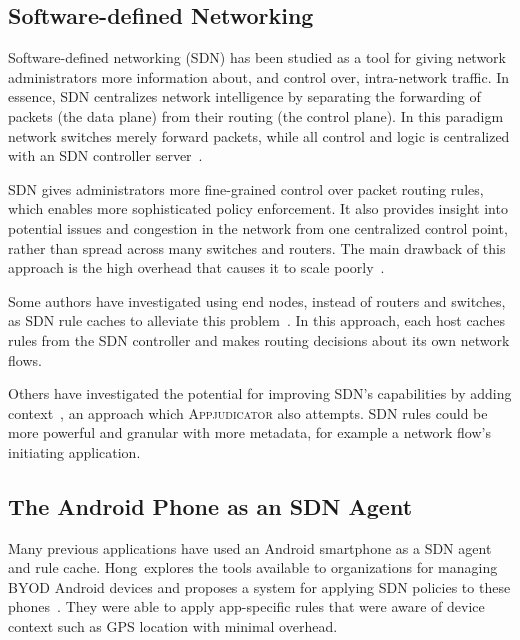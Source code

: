 \subsection{Software-defined Networking}
\label{sec:software-defined-networking}

Software-defined networking (SDN) has been studied as a tool for giving network administrators more information about, and control over, intra-network traffic. In essence, SDN centralizes network intelligence by separating the forwarding of packets (the data plane) from their routing (the control plane). In this paradigm network switches merely forward packets, while all control and logic is centralized with an SDN controller server~\cite{kim2013}.

SDN gives administrators more fine-grained control over packet routing rules, which enables more sophisticated policy enforcement. It also provides insight into potential issues and congestion in the network from one centralized control point, rather than spread across many switches and routers. The main drawback of this approach is the high overhead that causes it to scale poorly~\cite{benzekki2016}.

Some authors have investigated using end nodes, instead of routers and switches, as SDN rule caches to alleviate this problem~\cite{taylor2017, chuluundorj2019}. In this approach, each host caches rules from the SDN controller and makes routing decisions about its own network flows.

Others have investigated the potential for improving SDN's capabilities by adding context~\cite{yang2015}, an approach which \textsc{Appjudicator} also attempts. SDN rules could be more powerful and granular with more metadata, for example a network flow's initiating application.

\subsection{The Android Phone as an SDN Agent}
\label{sec:the-android-phone-as-an-sdn-agent}

Many previous applications have used an Android smartphone as a SDN agent and rule cache. Hong~\etal explores the tools available to organizations for managing BYOD Android devices and proposes a system for applying SDN policies to these phones~\cite{hong2016}. They were able to apply app-specific rules that were aware of device context such as GPS location with minimal overhead.


